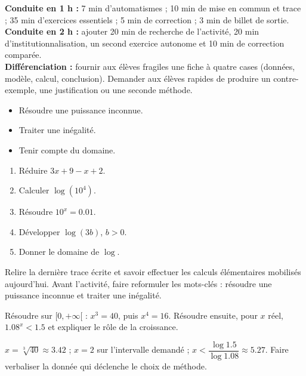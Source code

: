 \ifmxteacher
\begin{method}
\textbf{Conduite en 1 h :} 7 min d'automatismes ; 10 min de mise en commun et trace ; 35 min d'exercices essentiels ; 5 min de correction ; 3 min de billet de sortie.\\
\textbf{Conduite en 2 h :} ajouter 20 min de recherche de l'activité, 20 min d'institutionnalisation, un second exercice autonome et 10 min de correction comparée.\\
\textbf{Différenciation :} fournir aux élèves fragiles une fiche à quatre cases (données, modèle, calcul, conclusion). Demander aux élèves rapides de produire un contre-exemple, une justification ou une seconde méthode.
\end{method}
\fi
{}
\begin{objectives}\begin{itemize}\item Résoudre une puissance inconnue.\item Traiter une inégalité.\item Tenir compte du domaine.\end{itemize}\end{objectives}
\begin{fluency}\begin{enumerate}\item Réduire $3x+9-x+2$. \item Calculer $\log(10^4)$. \item Résoudre $10^x=\num{0,01}$. \item Développer $\log(3b)$, $b>0$. \item Donner le domaine de $\log$. \mxblank{$]0,+\infty[$}\end{enumerate}\end{fluency}
\begin{prerequisites}Relire la dernière trace écrite et savoir effectuer les calculs élémentaires mobilisés aujourd'hui. Avant l'activité, faire reformuler les mots-clés : résoudre une puissance inconnue et traiter une inégalité.\end{prerequisites}

\begin{activity}
Résoudre sur $[0,+\infty[$ : $x^3=40$, puis $x^4=16$. Résoudre ensuite, pour $x$ réel, $\num{1,08}^x<\num{1,5}$ et expliquer le rôle de la croissance.

\end{activity}
\begin{solution}$x=\sqrt[3]{40}\approx\num{3,42}$ ; $x=2$ sur l'intervalle demandé ; $x<\dfrac{\log\num{1,5}}{\log\num{1,08}}\approx\num{5,27}$. Faire verbaliser la donnée qui déclenche le choix de méthode.\end{solution}

